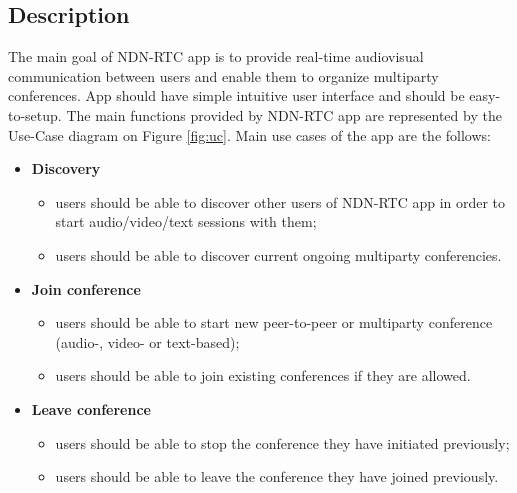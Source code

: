 \documentclass[12pt]{article}
\begin{document}
\subsection{Description}
The main goal of NDN-RTC app is to provide real-time audiovisual communication between users and enable them to organize multiparty conferences. App should have simple intuitive user interface and should be easy-to-setup. 
The main functions provided by NDN-RTC app are represented by the Use-Case diagram on Figure \ref{fig:uc}. Main use cases of the app are the follows:
\begin{itemize}
\item \textbf{Discovery} 
\begin{itemize}
\item users should be able to discover other users of NDN-RTC app in order to start audio/video/text sessions with them;
\item users should be able to discover current ongoing multiparty conferencies.
\end{itemize}
\item \textbf{Join conference}
\begin{itemize}
\item users should be able to start new peer-to-peer or multiparty conference (audio-, video- or text-based);
\item users should be able to join existing conferences if they are allowed.
\end{itemize}
\item \textbf{Leave conference}
\begin{itemize}
\item users should be able to stop the conference they have initiated previously; 
\item users should be able to leave the conference they have joined previously.
\end{itemize}
\end{itemize} 
\end{document}
